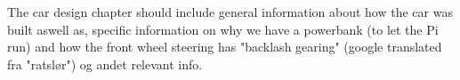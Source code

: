 
The car design chapter should include general information about how the car was built aswell as, 
specific information on why we have a powerbank (to let the Pi run) and how the front wheel steering has 
"backlash gearing" (google translated fra "ratslør") og andet relevant info. 